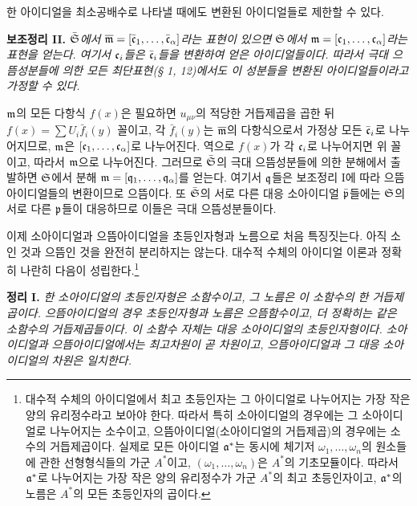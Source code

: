 한 아이디얼을 최소공배수로 나타낼 때에도 변환된 아이디얼들로 제한할 수 있다.

\textbf{보조정리 II.} \emph{\(\bar{\mathfrak S}\)에서 \(\overline{\mathfrak m}=[\bar{\mathfrak c}_1,\ldots,\bar{\mathfrak c}_\alpha]\)라는 표현이 있으면 \(\mathfrak S\)에서 \(\mathfrak m=[\mathfrak c_1,\ldots,\mathfrak c_\alpha]\)라는 표현을 얻는다. 여기서 \(\mathfrak c_i\)들은 \(\bar{\mathfrak c}_i\)들을 변환하여 얻은 아이디얼들이다. 따라서 극대 으뜸성분들에 의한 모든 최단표현(§ 1, 12)에서도 이 성분들을 변환된 아이디얼들이라고 가정할 수 있다.}

\(\mathfrak m\)의 모든 다항식 \(f(x)\)은 필요하면 \(u_{\mu\nu}\)의 적당한 거듭제곱을 곱한 뒤 \(f(x)=\sum U_i\bar f_i(y)\) 꼴이고, 각 \(\bar f_i(y)\)는 \(\overline{\mathfrak m}\)의 다항식으로서 가정상 모든 \(\bar{\mathfrak c}_i\)로 나누어지므로, \(\mathfrak m\)은 \([\mathfrak c_1,\ldots,\mathfrak c_\alpha]\)로 나누어진다. 역으로 \(f(x)\)가 각 \(\mathfrak c_i\)로 나누어지면 위 꼴이고, 따라서 \(\mathfrak m\)으로 나누어진다. 그러므로 \(\bar{\mathfrak S}\)의 극대 으뜸성분들에 의한 분해에서 출발하면 \(\mathfrak S\)에서 분해 \(\mathfrak m=[\mathfrak q_1,\ldots,\mathfrak q_\alpha]\)를 얻는다. 여기서 \(\mathfrak q\)들은 보조정리 I에 따라 으뜸아이디얼들의 변환이므로 으뜸이다. 또 \(\bar{\mathfrak S}\)의 서로 다른 대응 소아이디얼 \(\bar{\mathfrak p}\)들에는 \(\mathfrak S\)의 서로 다른 \(\mathfrak p\)들이 대응하므로 이들은 극대 으뜸성분들이다.

이제 소아이디얼과 으뜸아이디얼을 초등인자형과 노름으로 처음 특징짓는다. 아직 소인 것과 으뜸인 것을 완전히 분리하지는 않는다. 대수적 수체의 아이디얼 이론과 정확히 나란히 다음이 성립한다.\footnote{대수적 수체의 아이디얼에서 최고 초등인자는 그 아이디얼로 나누어지는 가장 작은 양의 유리정수라고 보아야 한다. 따라서 특히 소아이디얼의 경우에는 그 소아이디얼로 나누어지는 소수이고, 으뜸아이디얼(소아이디얼의 거듭제곱)의 경우에는 소수의 거듭제곱이다. 실제로 모든 아이디얼 \(\mathfrak a^*\)는 동시에 체기저 \(\omega_1,\ldots,\omega_n\)의 원소들에 관한 선형형식들의 가군 \(A^*\)이고, \((\omega_1,\ldots,\omega_n)\)은 \(A^*\)의 기초모듈이다. 따라서 \(\mathfrak a^*\)로 나누어지는 가장 작은 양의 유리정수가 가군 \(A^*\)의 최고 초등인자이고, \(\mathfrak a^*\)의 노름은 \(A^*\)의 모든 초등인자의 곱이다.}

\textbf{정리 I.} \emph{한 소아이디얼의 초등인자형은 소함수이고, 그 노름은 이 소함수의 한 거듭제곱이다. 으뜸아이디얼의 경우 초등인자형과 노름은 으뜸함수이고, 더 정확히는 같은 소함수의 거듭제곱들이다. 이 소함수 자체는 대응 소아이디얼의 초등인자형이다. 소아이디얼과 으뜸아이디얼에서는 최고차원이 곧 차원이고, 으뜸아이디얼과 그 대응 소아이디얼의 차원은 일치한다.}

